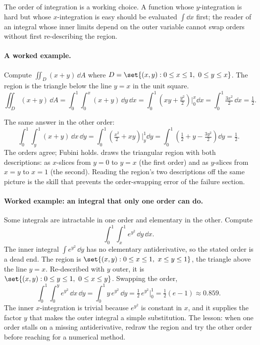The order of integration is a working choice. A function whose
$y$-integration is hard but whose $x$-integration is easy should be
evaluated $\int \dd x$ first; the reader of an integral whose inner
limits depend on the outer variable cannot swap orders without first
re-describing the region.

\paragraph{A worked example.} Compute $\iint_{D} (x + y) \,\dd A$
where $D = \set{(x, y) : 0 \leq x \leq 1,\ 0 \leq y \leq x}$. The
region is the triangle below the line $y = x$ in the unit square.
\[
\iint_{D} (x + y)\,\dd A = \int_{0}^{1}\!\int_{0}^{x}(x + y)\,\dd y\,
\dd x = \int_{0}^{1}\!\left(xy + \tfrac{y^{2}}{2}\right)\bigg|_{0}^{x}
\!\dd x = \int_{0}^{1}\tfrac{3 x^{2}}{2}\,\dd x = \tfrac{1}{2}.
\]

The same answer in the other order:
\[
\int_{0}^{1}\!\int_{y}^{1}(x + y)\,\dd x\,\dd y =
\int_{0}^{1}\!\left(\tfrac{x^{2}}{2} + xy\right)\bigg|_{y}^{1}\!\dd y
= \int_{0}^{1}\!\left(\tfrac{1}{2} + y - \tfrac{3 y^{2}}{2}\right)\dd y
= \tfrac{1}{2}.
\]
The orders agree; Fubini holds.
 draws the triangular
region with both descriptions: as $x$-slices from $y = 0$ to $y = x$
(the first order) and as $y$-slices from $x = y$ to $x = 1$ (the
second). Reading the region's two descriptions off the same picture
is the skill that prevents the order-swapping error of the failure
section.



\paragraph{Worked example: an integral that only one order can do.}
Some integrals are intractable in one order and elementary in the
other. Compute
\[
\int_{0}^{1}\!\int_{x}^{1} e^{y^{2}}\,\dd y\,\dd x.
\]
The inner integral $\int e^{y^{2}}\,\dd y$ has no elementary
antiderivative, so the stated order is a dead end. The region is
$\set{(x, y) : 0 \leq x \leq 1,\ x \leq y \leq 1}$, the triangle
above the line $y = x$. Re-described with $y$ outer, it is
$\set{(x, y) : 0 \leq y \leq 1,\ 0 \leq x \leq y}$. Swapping the
order,
\[
\int_{0}^{1}\!\int_{0}^{y} e^{y^{2}}\,\dd x\,\dd y
= \int_{0}^{1} y\,e^{y^{2}}\,\dd y
= \tfrac{1}{2}\,e^{y^{2}}\Big|_{0}^{1}
= \tfrac{1}{2}(e - 1) \approx 0.859.
\]
The inner $x$-integration is trivial because $e^{y^{2}}$ is constant
in $x$, and it supplies the factor $y$ that makes the outer integral
a simple substitution. The lesson: when one order stalls on a
missing antiderivative, redraw the region and try the other order
before reaching for a numerical method.

